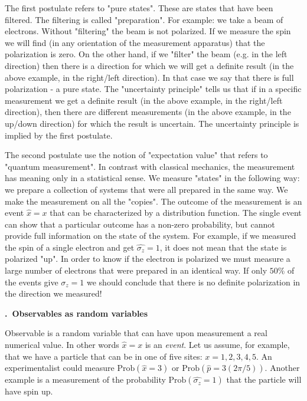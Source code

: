 \documentclass[onecolumn,fleqn, 11pt]{revtex4}
\renewcommand{\thesubsection}{\arabic{subsection}}
\renewcommand{\thesubsubsection}{\arabic{subsubsection}}
\newcommand{\sheadC}[1]
{
\addtocounter{subsubsection}{1}
\vspace{5mm}
{\bf \thesubsection.\thesubsubsection \ #1}  
\nopagebreak
\phantomsection
}
\begin{document}
 
The first postulate refers to "pure states". These 
are states that have been filtered. 
The filtering is called "preparation". 
For example: we take a beam of electrons. 
Without "filtering" the beam is not polarized. 
If we measure the spin we will 
find (in any orientation of the measurement apparatus) 
that the polarization is zero. On the other hand, 
if we "filter" the beam (e.g. in the left direction) 
then there is a direction for which we will get 
a definite result (in the above example, in the right/left direction). 
In that case we say that there is full polarization - a pure state. 
The "uncertainty principle" tells us that if in a specific 
measurement we get a definite result 
(in the above example, in the right/left direction), 
then there are different measurements 
(in the above example, in the up/down direction) 
for which the result is uncertain. 
The uncertainty principle is implied by the first postulate.


The second postulate use the notion of "expectation value" 
that refers to "quantum measurement". In contrast with classical 
mechanics, the measurement has meaning only in a statistical sense.   
We measure "states" in the following way: 
we prepare a collection of systems that 
were all prepared in the same way. We make the measurement 
on all the "copies". The outcome of the measurement is an 
event ${\hat{x} = x}$ that can be characterized by a distribution 
function. The single event can show that a particular outcome 
has a non-zero probability, but cannot provide full information 
on the state of the system.
For example, if we measured the spin of a single electron and 
get ${\hat{\sigma_z} = 1}$, it does not mean that the state is polarized "up". 
In order to know if the electron is polarized we must measure 
a large number of electrons that were prepared in an identical way. 
If only $50\%$ of the events give ${\hat{\sigma_z} = 1}$ we should  
conclude that there is no definite polarization in the direction we measured!

 
\sheadC{Observables as random variables} 

Observable is a random variable that can have upon measurement 
a real numerical value. In other words ${\hat{x} = {x}}$
is an {\em event}. Let us assume, for example, that 
we have a particle that can be in one of five 
sites: ${x = 1 , 2 , 3 , 4 , 5}$. An experimentalist 
could measure ${\mbox{Prob}( \hat{x} = 3 )}$ 
or ${\mbox{Prob}( \hat{p} = 3(2\pi/5) )}$. 
Another example is a measurement of the 
probability ${\mbox{Prob}( \hat{\sigma_z} = 1)}$ 
that the particle will have spin up. 
\end{document}
